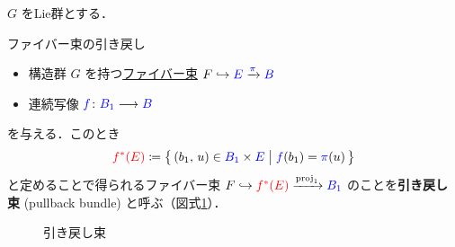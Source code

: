 \documentclass[TQFT_main]{subfiles}
\begin{document}
$G$ をLie群とする．

\begin{mydef}[label=def:pullback-bundle]{ファイバー束の引き戻し}
    \begin{itemize}
        \item 構造群 $G$ を持つ\hyperref[def.fiber-1]{ファイバー束} $F \hookrightarrow \textcolor{blue}{E} \xrightarrow{\textcolor{blue}{\pi}} \textcolor{blue}{B}$
        \item 連続写像 $\textcolor{blue}{f} \colon \textcolor{blue}{B_1} \longrightarrow \textcolor{blue}{B}$
    \end{itemize}
    を与える．このとき
    \begin{align}
        \textcolor{red}{f^* (E)} \coloneqq \bigl\{\, (b_1,\, u) \in \textcolor{blue}{B_1} \times \textcolor{blue}{E} \bigm| \textcolor{blue}{f}(b_1) = \textcolor{blue}{\pi}(u) \,\bigr\} 
    \end{align}
    と定めることで得られるファイバー束 $F \hookrightarrow \textcolor{red}{f^* (E)} \xrightarrow{\mathrm{proj}_1} \textcolor{blue}{B_1}$ のことを\textbf{引き戻し束} (pullback bundle) と呼ぶ（図式\ref{cmtd:pullback-bundle}）．
\end{mydef}

\begin{figure}[H]
    \centering
    \caption{引き戻し束}
    \label{cmtd:pullback-bundle}
\end{figure}%
\end{document}
